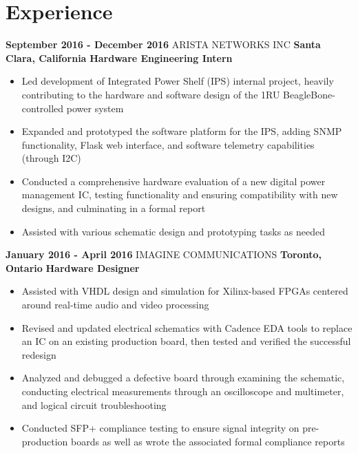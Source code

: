\documentclass[hidelinks]{kkurucz-cv}
\begin{document}
\vspace{-4.5mm}
\begin{minipage}{\textwidth}
\section{Experience}

\vspace{1mm}
\begin{entrylist}
\entry
{\textbf{September 2016 - December 2016}}
{ARISTA NETWORKS INC}
{\textbf{Santa Clara, California}}
{\textbf{Hardware Engineering Intern}}
{
\begin{itemize}
	\item Led development of Integrated Power Shelf (IPS) internal project, heavily contributing to the hardware and software design of the 1RU BeagleBone-controlled power system
	\item Expanded and prototyped the software platform for the IPS, adding SNMP functionality, Flask web interface, and software telemetry capabilities (through I2C)
	\item Conducted a comprehensive hardware evaluation of a new digital power management IC, testing functionality and ensuring compatibility with new designs, and culminating in a formal report
	\item Assisted with various schematic design and prototyping tasks as needed
\end{itemize}
}

\entry
{\textbf{January 2016 - April 2016}}
{IMAGINE COMMUNICATIONS}
{\textbf{Toronto, Ontario}}
{\textbf{Hardware Designer}}
{
\begin{itemize}
	\item Assisted with VHDL design and simulation for Xilinx-based FPGAs centered around real-time audio and video processing
	\item Revised and updated electrical schematics with Cadence EDA tools to replace an IC on an existing production board, then tested and verified the successful redesign
	\item Analyzed and debugged a defective board through examining the schematic, conducting electrical measurements through an oscilloscope and multimeter, and logical circuit troubleshooting
	\item Conducted SFP+ compliance testing to ensure signal integrity on pre-production boards as well as wrote the associated formal compliance reports
\end{itemize}
}


\end{entrylist}
\end{minipage}
\end{document}
